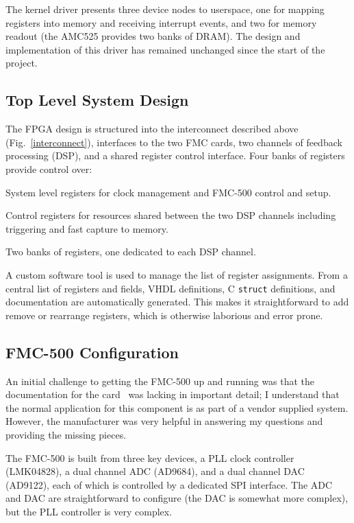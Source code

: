 \documentclass[
    a4paper,
    keeplastbox,            %
    hyphens,                %
    nospread,               %
]{jacow-2_1}
\begin{document}
The kernel driver presents three device nodes to userspace, one for mapping
registers into memory and receiving interrupt events, and two for memory readout
(the AMC525 provides two banks of DRAM).  The design and implementation of this
driver has remained unchanged since the start of the project.


\subsection{Top Level System Design}

The FPGA design is structured into the interconnect described above
(Fig.~\ref{interconnect}), interfaces to the two FMC cards, two channels of
feedback processing (DSP), and a shared register control interface.  Four banks
of registers provide control over:
\begin{Itemize}
\item
    System level registers for clock management and FMC-500 control and setup.
\item
    Control registers for resources shared between the two DSP channels
    including triggering and fast capture to memory.
\item
    Two banks of registers, one dedicated to each DSP channel.
\end{Itemize}

A custom software tool is used to manage the list of register assignments.  From
a central list of registers and fields, VHDL definitions, C \texttt{struct}
definitions, and documentation are automatically generated.  This makes it
straightforward to add remove or rearrange registers, which is otherwise
laborious and error prone.


\subsection{FMC-500 Configuration}

An initial challenge to getting the FMC-500 up and running was that the
documentation for the card~\cite{fmc500} was lacking in important detail; I
understand that the normal application for this component is as part of a vendor
supplied system.  However, the manufacturer was very helpful in answering my
questions and providing the missing pieces.

The FMC-500 is built from three key devices, a PLL clock controller (LMK04828),
a dual channel ADC (AD9684), and a dual channel DAC (AD9122), each of which is
controlled by a dedicated SPI interface.  The ADC and DAC are straightforward to
configure (the DAC is somewhat more complex), but the PLL controller is very
complex.
\end{document}
